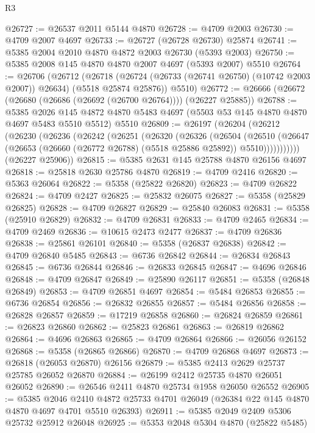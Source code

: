 \begin{lexlean}{R3}
\begin{coremodule}
@26727 := @26537 @2011 @5144 @4870
@26728 := @4709 @2003
@26730 := @4709 @2007 @4697
@26733 := @26727 (@26728 @26730) @25874
@26741 := @5385 @2004 @2010 @4870 @4872 @2003 @26730 (@5393 @2003)
@26750 := @5385 @2008 @145 @4870 @4870 @2007 @4697 (@5393 @2007) @5510
@26764 := @26706
    (@26712
      (@26718 (@26724 (@26733 (@26741 @26750) (@10742 @2003 @2007)) @26634) (@5518 @25874 @25876))
      @5510)
@26772 := @26666 (@26672 (@26680 (@26686 (@26692 (@26700 @26764)))) (@26227 @25885))
@26788 := @5385
    @2026
    @145
    @4872
    @4870
    @5483
    @4697
    (@5503 @53 @145 @4870 @4870 @4697 @5483 @5510 @5512)
    @5510
@26809 := @26197
    (@26204
      (@26212
        (@26230
          (@26236
            (@26242
              (@26251
                (@26320
                  (@26326
                    (@26504
                      (@26510
                        (@26647
                          (@26653 (@26660 (@26772 @26788) (@5518 @25886 @25892)) @5510)))))))))))
      (@26227 @25906))
@26815 := @5385 @2631 @145 @25788 @4870 @26156 @4697
@26818 := @25818 @2630 @25786 @4870
@26819 := @4709 @2416
@26820 := @5363 @26064
@26822 := @5358 (@25822 @26820)
@26823 := @4709 @26822
@26824 := @4709 @2427
@26825 := @25832 @26075
@26827 := @5358 (@25829 @26825)
@26828 := @4709 @26827
@26829 := @25840 @26083
@26831 := @5358 (@25910 @26829)
@26832 := @4709 @26831
@26833 := @4709 @2465
@26834 := @4709 @2469
@26836 := @10615 @2473 @2477
@26837 := @4709 @26836
@26838 := @25861 @26101
@26840 := @5358 (@26837 @26838)
@26842 := @4709 @26840 @5485
@26843 := @6736 @26842
@26844 := @26834 @26843
@26845 := @6736 @26844
@26846 := @26833 @26845
@26847 := @4696 @26846
@26848 := @4709 @26847
@26849 := @25890 @26117
@26851 := @5358 (@26848 @26849)
@26853 := @4709 @26851 @4697
@26854 := @5484 @26853
@26855 := @6736 @26854
@26856 := @26832 @26855
@26857 := @5484 @26856
@26858 := @26828 @26857
@26859 := @17219 @26858
@26860 := @26824 @26859
@26861 := @26823 @26860
@26862 := @25823 @26861
@26863 := @26819 @26862
@26864 := @4696 @26863
@26865 := @4709 @26864
@26866 := @26056 @26152
@26868 := @5358 (@26865 @26866)
@26870 := @4709 @26868 @4697
@26873 := @26818 (@26053 @26870) @26156
@26879 := @5385 @2413 @2629 @25737 @25785 @26052 @26870
@26884 := @26199 @2412 @25735 @4870 @26051 @26052
@26890 := @26546 @2411 @4870 @25734 @1958 @26050 @26552
@26905 := @5385
    @2046
    @2410
    @4872
    @25733
    @4701
    @26049
    (@26384 @22 @145 @4870 @4870 @4697 @4701 @5510 @26393)
@26911 := @5385 @2049 @2409 @5306 @25732 @25912 @26048
@26925 := @5353
    @2048
    @5304
    @4870
    (@25822 @5485)

\end{coremodule}
\end{lexlean}
